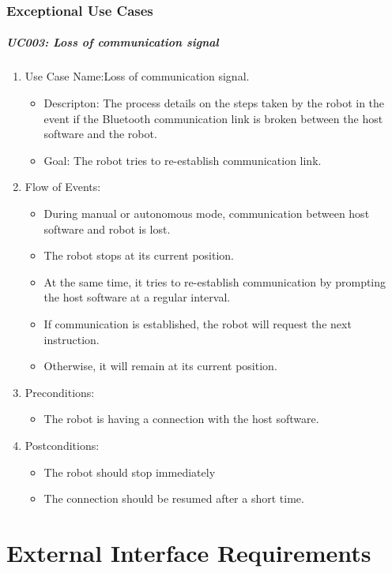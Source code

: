 \documentclass[11pt, a4paper]{report}
\begin{document}
\subsection{Exceptional Use Cases}
\paragraph {UC003: Loss of communication signal}
\begin{enumerate}
	\item Use Case Name:Loss of communication signal.
	\begin{itemize}
		\item Descripton: The process details on the steps taken by the robot in the event if the Bluetooth
communication link is broken between the host software and the robot.
		\item Goal: The robot tries to re-establish communication link.
	\end{itemize}
	\item Flow of Events:
	\begin{itemize}
		\item During manual or autonomous mode, communication between host software and
robot is lost.
		\item The robot stops at its current position.
		\item At the same time, it tries to re-establish communication by prompting the host software
at a regular interval.
		\item If communication is established, the robot will request the next instruction.
		\item Otherwise, it will remain at its current position.
	\end{itemize}
	\item Preconditions:
	\begin{itemize}
		\item The robot is having a connection with the host software.
	\end{itemize}
\item Postconditions:
	\begin{itemize}
		\item The robot should stop immediately
		\item The connection should be resumed after a short time.
	\end{itemize}
\end{enumerate}
\pagebreak
 


\chapter{External Interface Requirements}
\end{document}
